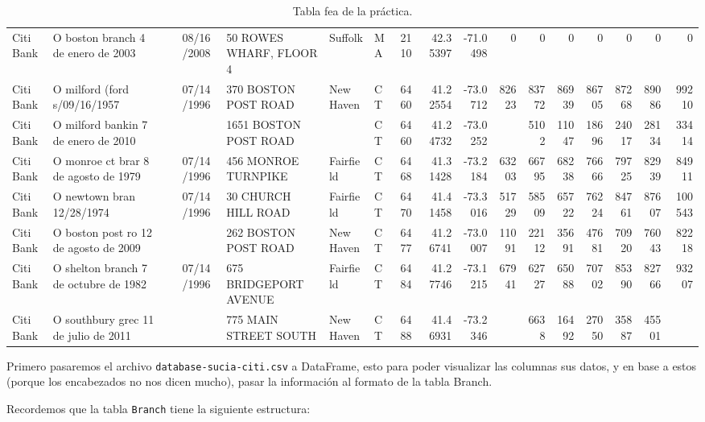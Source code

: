 \begin{table}[H]
{\begin{tabular}{llllllllrrrrrrrrr}
            \midrule
            Citi Bank & O boston branch 4 de enero de 2003 & & 08/16/2008 & 50 ROWES WHARF, FLOOR 4 & Suffolk & MA & 2110 & 42.35397 & -71.0498 & 0 & 0 & 0 & 0 & 0 & 0 & 0 \\
            Citi Bank & O milford (ford s/09/16/1957 & & 07/14/1996 & 370 BOSTON POST ROAD & New Haven & CT & 6460 & 41.22554 & -73.0712 & 82623 & 83772 & 86939 & 86705 & 87268 & 89086 & 99210 \\
            Citi Bank & O milford bankin 7 de enero de 2010 & & & 1651 BOSTON POST ROAD & & CT & 6460 & 41.24732 & -73.0252 & & 5102 & 11047 & 18696 & 24017 & 28134 & 33414 \\
            Citi Bank & O monroe ct brar 8 de agosto de 1979 & & 07/14/1996 & 456 MONROE TURNPIKE & Fairfield & CT & 6468 & 41.31428 & -73.2184 & 63203 & 66795 & 68238 & 76666 & 79725 & 82939 & 84911 \\
            Citi Bank & O newtown bran 12/28/1974 & & 07/14/1996 & 30 CHURCH HILL ROAD & Fairfield & CT & 6470 & 41.41458 & -73.3016 & 51729 & 58509 & 65722 & 76224 & 84761 & 87607 & 100543 \\
            Citi Bank & O boston post ro 12 de agosto de 2009 & & & 262 BOSTON POST ROAD & New Haven & CT & 6477 & 41.26741 & -73.0007 & 11091 & 22112 & 35691 & 47681 & 70920 & 76043 & 82218 \\
            Citi Bank & O shelton branch 7 de octubre de 1982 & & 07/14/1996 & 675 BRIDGEPORT AVENUE & Fairfield & CT & 6484 & 41.27746 & -73.1215 & 67941 & 62727 & 65088 & 70702 & 85390 & 82766 & 93207 \\
            Citi Bank & O southbury grec 11 de julio de 2011 & & & 775 MAIN STREET SOUTH & New Haven & CT & 6488 & 41.46931 & -73.2346 & & 6638 & 16492 & 27050 & 35887 & 45501 & \\
            \bottomrule
        \end{tabular}
    }
    \caption{Tabla fea de la práctica.}
    \label{table:1}
\end{table}

\vspace{0.5 cm}

Primero pasaremos el archivo \texttt{database-sucia-citi.csv} 
a DataFrame, esto para poder visualizar las columnas sus datos, 
y en base a estos (porque los encabezados no nos dicen mucho), 
pasar la información al formato de la tabla Branch.

\vspace{1.5 cm}

Recordemos que la tabla \texttt{Branch} tiene la siguiente estructura:

